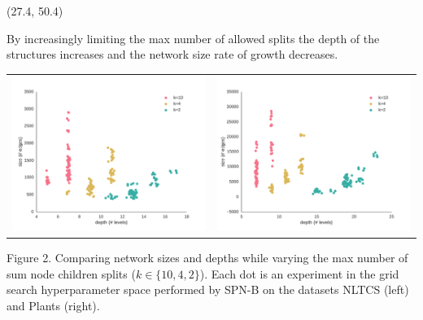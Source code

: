 \documentclass[final]{beamer}
\begin{document}
\begin{frame}{}
  \begin{textblock}{25.2}(27.4, 50.4)

    \footnotesize
    By increasingly limiting the max number of allowed splits the depth of the
    structures increases and the network size rate of growth
    decreases.  
    \begin{table}[ht]
      \setlength{\tabcolsep}{30pt}  
      \centering
      \begin{tabular}{c c}
        \includegraphics[width=0.4\linewidth]{figures/nltcs-depth.pdf}&\includegraphics[width=0.4\linewidth]{figures/plants-depth.pdf}
      \end{tabular}
    \end{table}
    \vspace{-20pt}
    \begin{center}
      \begin{minipage}[t]{0.9\linewidth}
        \tiny\flushleft
        Figure 2. Comparing network sizes and depths while varying the max
        number of sum node children splits ($k\in\{10, 4, 2\}$). Each dot is an experiment
        in the grid search hyperparameter space performed by
        \textsf{SPN-B} on the datasets NLTCS (left) and
        Plants (right).
      \end{minipage}
    \end{center}

    
  \end{textblock}
  

\end{frame}
\end{document}
